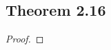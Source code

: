 \documentclass[../../main.tex]{subfiles}
\begin{document}
\subsection{Theorem 2.16}
\begin{wts}

\end{wts}
\begin{proof}

\end{proof}
\end{document}
